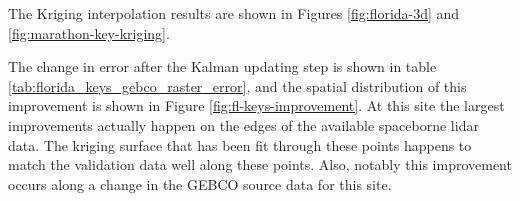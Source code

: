 \begin{figure}[!ht]
\begin{floatrow}
\end{floatrow}
\end{figure}


The Kriging interpolation results are shown in Figures \ref{fig:florida-3d} and \ref{fig:marathon-key-kriging}.

The change in error after the Kalman updating step is shown in table \ref{tab:florida_keys_gebco_raster_error}, and the spatial distribution of this improvement is shown in Figure \ref{fig:fl-keys-improvement}. At this site the largest improvements actually happen on the edges of the available spaceborne lidar data. The kriging surface that has been fit through these points happens to match the validation data well along these points. Also, notably this improvement occurs along a change in the GEBCO source data for this site.

